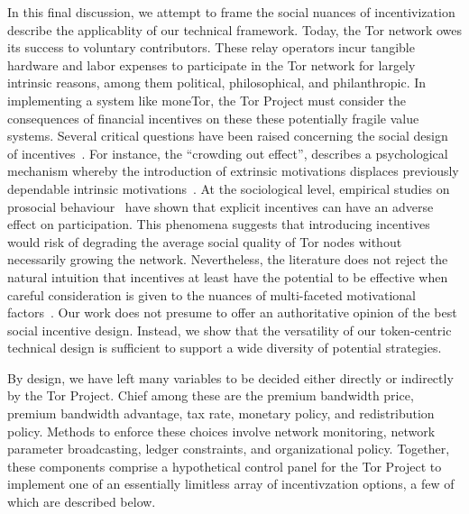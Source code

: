 

In this final discussion, we attempt to frame the social nuances of
incentivization describe the applicablity of our technical framework. Today, the
Tor network owes its success to voluntary contributors. These relay operators
incur tangible hardware and labor expenses to participate in the Tor network for
largely intrinsic reasons, among them political, philosophical, and
philanthropic. In implementing a system like moneTor, the Tor Project must
consider the consequences of financial incentives on these these potentially
fragile value systems. Several critical questions have been raised concerning
the social design of incentives~\cite{jansenblogpost}. For instance, the
``crowding out effect'', describes a psychological mechanism whereby the
introduction of extrinsic motivations displaces previously dependable intrinsic
motivations~\cite{10.1257/jep.25.4.191}. At the sociological level, empirical
studies on prosocial behaviour~\cite{10.1257/aer.96.5.1652} have shown that
explicit incentives can have an adverse effect on participation. This phenomena
suggests that introducing incentives would risk of degrading the average social
quality of Tor nodes without necessarily growing the network. Nevertheless, the
literature does not reject the natural intuition that incentives at least have
the potential to be effective when careful consideration is given to the nuances
of multi-faceted motivational factors~\cite{10.1257/aer.96.5.1652}. Our work
does not presume to offer an authoritative opinion of the best social incentive
design. Instead, we show that the versatility of our token-centric technical
design is sufficient to support a wide diversity of potential strategies.

By design, we have left many variables to be decided either directly or
indirectly by the Tor Project. Chief among these are the premium bandwidth
price, premium bandwidth advantage, tax rate, monetary policy, and
redistribution policy. Methods to enforce these choices involve network
monitoring, network parameter broadcasting, ledger constraints, and
organizational policy. Together, these components comprise a hypothetical
control panel for the Tor Project to implement one of an essentially limitless
array of incentivzation options, a few of which are described below.

